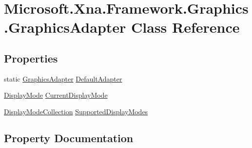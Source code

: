 \hypertarget{class_microsoft_1_1_xna_1_1_framework_1_1_graphics_1_1_graphics_adapter}{}\section{Microsoft.\+Xna.\+Framework.\+Graphics.\+Graphics\+Adapter Class Reference}
\label{class_microsoft_1_1_xna_1_1_framework_1_1_graphics_1_1_graphics_adapter}
\subsection*{Properties}
\begin{DoxyCompactItemize}
\item 
static \hyperlink{class_microsoft_1_1_xna_1_1_framework_1_1_graphics_1_1_graphics_adapter}{Graphics\+Adapter} \hyperlink{class_microsoft_1_1_xna_1_1_framework_1_1_graphics_1_1_graphics_adapter_a8a5f2076de589bf7ddb6199d3c430ec2}{Default\+Adapter}
\item 
\hyperlink{class_microsoft_1_1_xna_1_1_framework_1_1_graphics_1_1_display_mode}{Display\+Mode} \hyperlink{class_microsoft_1_1_xna_1_1_framework_1_1_graphics_1_1_graphics_adapter_ad7bbb94c5f0464b782b916330c063c0e}{Current\+Display\+Mode}
\item 
\hyperlink{class_microsoft_1_1_xna_1_1_framework_1_1_graphics_1_1_display_mode_collection}{Display\+Mode\+Collection} \hyperlink{class_microsoft_1_1_xna_1_1_framework_1_1_graphics_1_1_graphics_adapter_a078436f88441fb7080d70bc1b7d8033b}{Supported\+Display\+Modes}
\end{DoxyCompactItemize}


\subsection{Property Documentation}
\hypertarget{class_microsoft_1_1_xna_1_1_framework_1_1_graphics_1_1_graphics_adapter_ad7bbb94c5f0464b782b916330c063c0e}{}
